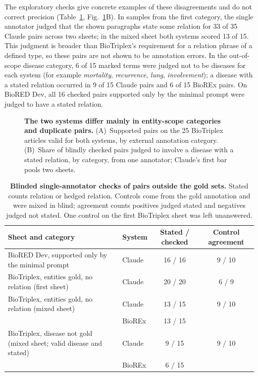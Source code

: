 \documentclass[preprint,10pt,letterpaper]{elsarticle}
\begin{document}
The exploratory checks give concrete examples of these disagreements and do not correct precision (Table~\ref{tab:checks}, Fig.~\ref{fig:fp}B). In samples from the first category, the single annotator judged that the shown paragraphs state some relation for 33 of 35 Claude pairs across two sheets; in the mixed sheet both systems scored 13 of 15. This judgment is broader than BioTriplex's requirement for a relation phrase of a defined type, so these pairs are not shown to be annotation errors. In the out-of-scope disease category, 6 of 15 marked terms were judged not to be diseases for each system (for example \emph{mortality}, \emph{recurrence}, \emph{lung}, \emph{involvement}); a disease with a stated relation occurred in 9 of 15 Claude pairs and 6 of 15 BioREx pairs. On BioRED Dev, all 16 checked pairs supported only by the minimal prompt were judged to have a stated relation.

\begin{figure}[!htbp]
\centering
\resizebox{\linewidth}{!}{}
\caption{\textbf{The two systems differ mainly in entity-scope categories and duplicate pairs.} (A)~Supported pairs on the 25 BioTriplex articles valid for both systems, by external annotation category. (B)~Share of blindly checked pairs judged to involve a disease with a stated relation, by category, from one annotator; Claude's first bar pools two sheets.}
\label{fig:fp}
\end{figure}

\begin{table}[!htbp]
\centering\footnotesize
\caption{\textbf{Blinded single-annotator checks of pairs outside the gold sets.} Stated counts relation or hedged relation. Controls come from the gold annotation and were mixed in blind; agreement counts positives judged stated and negatives judged not stated. One control on the first BioTriplex sheet was left unanswered.}
\label{tab:checks}
\begin{tabularx}{\linewidth}{@{}Xlcc@{}}
\toprule
Sheet and category & System & Stated / checked & Control agreement\\
\midrule
BioRED Dev, supported only by the minimal prompt & Claude & 16 / 16 & 9 / 10\\
BioTriplex, entities gold, no relation (first sheet) & Claude & 20 / 20 & 6 / 9\\
BioTriplex, entities gold, no relation (mixed sheet) & Claude & 13 / 15 & 9 / 10\\
 & BioREx & 13 / 15 & \\
BioTriplex, disease not gold (mixed sheet; valid disease and stated) & Claude & 9 / 15 & 9 / 10\\
 & BioREx & 6 / 15 & \\
\bottomrule
\end{tabularx}
\end{table}
\end{document}
